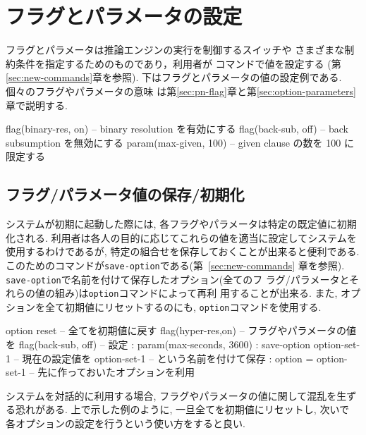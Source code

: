 \section{フラグとパラメータの設定}
\label{sec:flags-and-parameters}
フラグとパラメータは推論エンジンの実行を制御するスイッチや
さまざまな制約条件を指定するためのものであり，利用者が
コマンドで値を設定する
(第\ref{sec:new-commands}章を参照).
下はフラグとパラメータの値の設定例である. 個々のフラグやパラメータの意味
は第\ref{sec:pn-flag}章と第\ref{sec:option-parameters}章で説明する.

\begin{vvtm}
\begin{examplev}
  flag(binary-res, on)        -- binary resolution を有効にする
  flag(back-sub, off)         -- back subsumption を無効にする
  param(max-given, 100)       -- given clause の数を 100 に限定する
\end{examplev}
\end{vvtm}

\subsection{フラグ/パラメータ値の保存/初期化}
\label{sec:init-options}
システムが初期に起動した際には, 各フラグやパラメータは特定の既定値に初期
化される. 利用者は各人の目的に応じてこれらの値を適当に設定してシステムを
使用するわけであるが, 特定の組合せを保存しておくことが出来ると便利である. 
このためのコマンドが\texttt{save-option}である(第~\ref{sec:new-commands}
章を参照).  \texttt{save-option}で名前を付けて保存したオプション(全てのフ
ラグ/パラメータとそれらの値の組み)は\texttt{option}コマンドによって再利
用することが出来る. また, オプションを全て初期値にリセットするのにも,
\texttt{option}コマンドを使用する.

\begin{vvtm}
\begin{examplev}
  option reset               -- 全てを初期値に戻す
  flag(hyper-res,on)         -- フラグやパラメータの値を
  flag(back-sub, off)        -- 設定
       :
  param(max-seconds, 3600)
       :
  save-option option-set-1   -- 現在の設定値を option-set-1
                             -- という名前を付けて保存
       :
  option = option-set-1      -- 先に作っておいたオプションを利用  
\end{examplev}
\end{vvtm}

システムを対話的に利用する場合, フラグやパラメータの値に関して混乱を生ず
る恐れがある. 上で示した例のように, 一旦全てを初期値にリセットし, 次いで
各オプションの設定を行うという使い方をすると良い.

